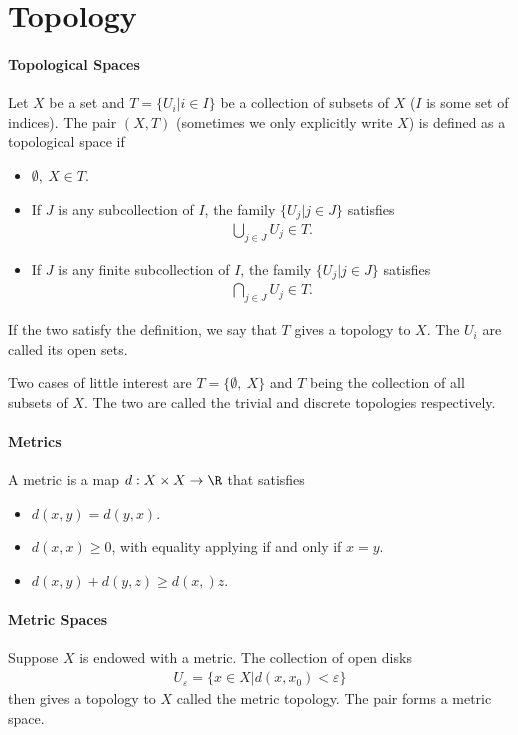 \section{Topology}

\paragraph{Topological Spaces}
Let $X$ be a set and $T = \{U_{i} | i\in I\}$ be a collection of subsets of $X$ ($I$ is some set of indices). The pair $(X, T)$ (sometimes we only explicitly write $X$) is defined as a topological space if
\begin{itemize}
	\item $\emptyset,\ X\in T$.
	\item If $J$ is any subcollection of $I$, the family $\{U_{j} | j\in J\}$ satisfies
	\begin{align*}
		\bigcup\limits_{j\in J}U_{j}\in T.
	\end{align*}
	\item If $J$ is any finite subcollection of $I$, the family $\{U_{j} | j\in J\}$ satisfies
	\begin{align*}
		\bigcap\limits_{j\in J}U_{j}\in T.
	\end{align*}
\end{itemize}
If the two satisfy the definition, we say that $T$ gives a topology to $X$. The $U_{i}$ are called its open sets.

Two cases of little interest are $T = \{\emptyset,\ X\}$ and $T$ being the collection of all subsets of $X$. The two are called the trivial and discrete topologies respectively.

\paragraph{Metrics}
A metric is a map $d: X\times X\to \R$ that satisfies
\begin{itemize}
	\item $d(x, y) = d(y, x)$.
	\item $d(x, x) \geq 0$, with equality applying if and only if $x = y$.
	\item $d(x, y) + d(y, z) \geq d(x, )z$.
\end{itemize}

\paragraph{Metric Spaces}
Suppose $X$ is endowed with a metric. The collection of open disks
\begin{align*}
	U_{\varepsilon} = \{x\in X | d(x, x_{0}) < \varepsilon\}
\end{align*}
then gives a topology to $X$ called the metric topology. The pair forms a metric space.

